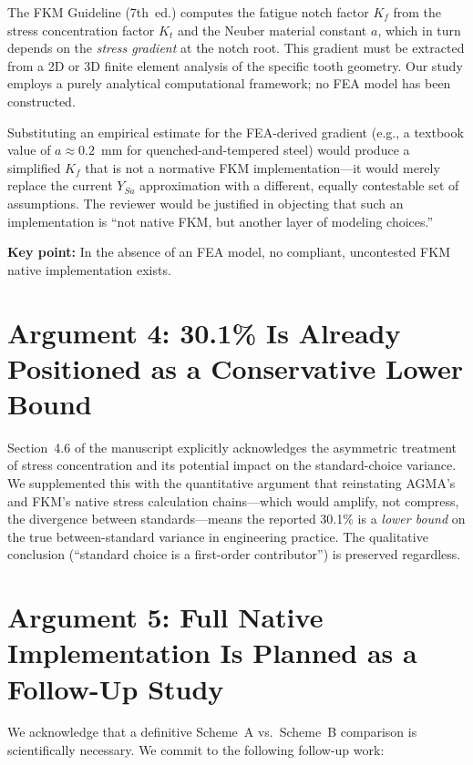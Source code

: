 \documentclass[12pt,a4paper]{article}
\begin{document}
The FKM Guideline (7th~ed.) computes the fatigue notch factor $K_f$
from the stress concentration factor $K_t$ and the Neuber material
constant $a$, which in turn depends on the \emph{stress gradient} at
the notch root. This gradient must be extracted from a 2D or 3D finite
element analysis of the specific tooth geometry. Our study employs a
purely analytical computational framework; no FEA model has been
constructed.

Substituting an empirical estimate for the FEA-derived gradient (e.g.,
a textbook value of $a \approx 0.2$~mm for quenched-and-tempered steel)
would produce a simplified $K_f$ that is not a normative FKM
implementation---it would merely replace the current $Y_{Sa}$
approximation with a different, equally contestable set of assumptions.
The reviewer would be justified in objecting that such an
implementation is ``not native FKM, but another layer of modeling
choices.''

\textbf{Key point:} In the absence of an FEA model, no compliant,
uncontested FKM native implementation exists.

\section*{Argument 4: 30.1\% Is Already Positioned as a Conservative Lower Bound}

Section~4.6 of the manuscript explicitly acknowledges the asymmetric
treatment of stress concentration and its potential impact on the
standard-choice variance. We supplemented this with the quantitative
argument that reinstating AGMA's and FKM's native stress calculation
chains---which would amplify, not compress, the divergence between
standards---means the reported 30.1\% is a \emph{lower bound} on the
true between-standard variance in engineering practice. The qualitative
conclusion (``standard choice is a first-order contributor'') is
preserved regardless.

\section*{Argument 5: Full Native Implementation Is Planned as a Follow-Up Study}

We acknowledge that a definitive Scheme~A vs.\ Scheme~B comparison is
scientifically necessary. We commit to the following follow-up work:
\end{document}
